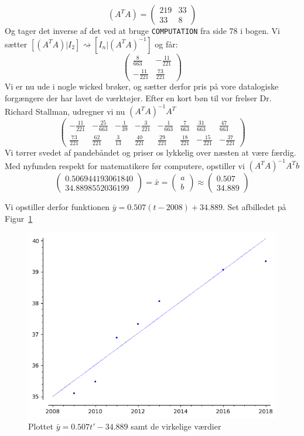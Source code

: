 \documentclass[a4paper,fleqn]{article}
\begin{document}
	\[ (A^TA) = \left(\begin{array}{rr}
		219 & 33 \\
		33 & 8
	\end{array}\right)\]
	Og tager det inverse af det ved at bruge \verb!COMPUTATION! fra side 78 i bogen. Vi sætter
	$[(A^TA)|I_2] \rightsquigarrow [I_n|(A^TA)^{-1}]$ og får:
	\[ \left(\begin{array}{rr}
\frac{8}{663} & -\frac{11}{221} \\
-\frac{11}{221} & \frac{73}{221}
	\end{array}\right)\]
	Vi er nu ude i nogle wicked brøker, og sætter derfor pris på vore datalogiske
	forgængere der har lavet de værktøjer. Efter en kort bøn til vor frelser Dr. Richard
	Stallman, udregner vi nu $(A^TA)^{-1}A^T$
	\[\left(\begin{array}{rrrrrrrr}
		-\frac{11}{221} & -\frac{25}{663} & -\frac{1}{39} & -\frac{3}{221} & -\frac{1}{663} & \frac{7}{663} & \frac{31}{663} & \frac{47}{663} \\
		\frac{73}{221} & \frac{62}{221} & \frac{3}{13} & \frac{40}{221} & \frac{29}{221} & \frac{18}{221} & -\frac{15}{221} & -\frac{37}{221}
	\end{array}\right)\]
	Vi tørrer svedet af pandebåndet og priser os lykkelig over næsten at være færdig. Med 
	nyfunden respekt for matematikere før computere, opstiller vi $(A^TA)^{-1}A^Tb$
	\[\left(\begin{array}{r}
		0.506944193061840 \\
		34.8898552036199
\end{array}\right) = \bar{x} = \begin{pmatrix}a\\b\end{pmatrix}\approx \begin{pmatrix}0.507\\34.889\end{pmatrix}\]
	
Vi opstiller derfor funktionen $\bar{y} = 0.507(t-2008) + 34.889$. Set afbilledet på Figur~\ref{fig:weirdplot}
	\begin{figure}[!htb]
		\centering
		\includegraphics[width=0.4\linewidth]{3a.png}
		\caption{Plottet $\bar{y} = 0.507t' - 34.889$ samt de virkelige værdier}
		\label{fig:weirdplot}
	\end{figure}
\end{document}
